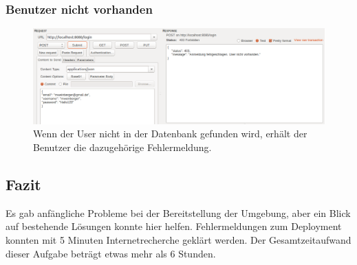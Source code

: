 \documentclass[letterpaper, 12pt]{article}
\let\tempsubsection\subsection
\renewcommand\subsection[1]{\vspace{0cm}\tempsubsection{#1}\vspace{0cm}}
\let\tempsubsubsection\subsubsection
\renewcommand\subsubsection[1]{\vspace{0cm}\tempsubsubsection{#1}\vspace{0cm}}
\begin{document}
\subsubsection{Benutzer nicht vorhanden}
\begin{figure}[h]
	\includegraphics[width=1\textwidth]{images/login_fehl}
	\caption{Wenn der User nicht in der Datenbank gefunden wird, erhält der Benutzer die dazugehörige Fehlermeldung.}
\end{figure}

\subsection{Fazit}
Es gab anfängliche Probleme bei der Bereitstellung der Umgebung, aber ein Blick auf bestehende Lösungen konnte hier helfen. Fehlermeldungen zum Deployment konnten mit 5 Minuten Internetrecherche geklärt werden. Der Gesamtzeitaufwand dieser Aufgabe beträgt etwas mehr als 6 Stunden.

\newpage



\clearpage
\listoffigures
\end{document}
